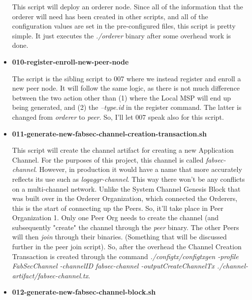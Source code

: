 \begin{itemize}
					\hspace{10mm}This script will deploy an orderer node. Since all of the information that the orderer will need has been created in other scripts, and all of the configuration values are set in the pre-configured files, this script is pretty simple. It just executes the \textit{./orderer} binary after some overhead work is done.
					
				\item \textbf{010-register-enroll-new-peer-node}
				
					\hspace{10mm}The script is the sibling script to 007 where we instead register and enroll a new peer node. It will follow the same logic, as there is not much difference between the two action other than (1) where the Local MSP will end up being generated, and (2) the \textit{--type.id} in the register command. The latter is changed from \textit{orderer} to \textit{peer}. So, I'll let 007 speak also for this script.
					
				\item \textbf{011-generate-new-fabsec-channel-creation-transaction.sh}
				
					\hspace{10mm}This script will create the channel artifact for creating a new Application Channel. For the purposes of this project, this channel is called \textit{fabsec-channel}. However, in production it would have a name that more accurately reflects its use such as \textit{logaggr-channel}. This way there won't be any conflicts on a multi-channel network. Unlike the System Channel Genesis Block that was built over in the Orderer Organization, which connected the Orderers, this is the start of connecting up the Peers. So, it'll take place in Peer Organization 1. Only one Peer Org needs to create the channel (and subsequently "create" the channel through the \textit{peer} binary. The other Peers will then \textit{join} through their binaries. (Something that will be discussed further in the peer join script). So, after the overhead the Channel Creation Transaction is created through the command \textit{./configtx/configtxgen -profile FabSecChannel -channelID fabsec-channel -outputCreateChannelTx ./channel-artifact/fabsec-channel.tx}.
					
				\item \textbf{012-generate-new-fabsec-channel-block.sh}
					

\end{itemize}
